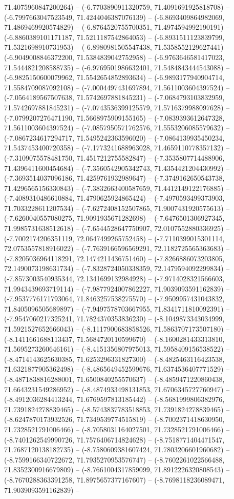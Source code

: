 71.4075960847200264) -- (-6.7703890911320759, 71.4091691925818708) -- (-6.7997663047523549, 71.4244046387076139) -- (-6.8693409864982069, 71.4869469920574829) -- (-6.8764520755700351, 71.4974594992190191) -- (-6.8860389101171187, 71.5211187542864053) -- (-6.8931511123839799, 71.5321698910731953) -- (-6.8980981505547438, 71.5358552129627441) -- (-6.9049008846372200, 71.5384839042752958) -- (-6.9763646581417023, 71.5444821208588735) -- (-6.9769501986632401, 71.5484843444543088) -- (-6.9825150600079962, 71.5542654852893634) -- (-6.9893177940904714, 71.5584709087092108) -- (-7.0004497431697894, 71.5611003604397524) -- (-7.0564189567507638, 71.5742697881845231) -- (-7.0684793103832959, 71.5742697881845231) -- (-7.0743536399125579, 71.5716379988097628) -- (-7.0799207276471190, 71.5668975909155165) -- (-7.0839393612647328, 71.5611003604397524) -- (-7.0857950571762576, 71.5553206085579632) -- (-7.0867234617294717, 71.5495242363596020) -- (-7.0864139935450234, 71.5437453400720358) -- (-7.1773241688963028, 71.4659110778357132) -- (-7.3109075578481750, 71.4517212755582847) -- (-7.3535807714488906, 71.4396411600454684) -- (-7.3560542905342743, 71.4354421204430992) -- (-7.3693514037096186, 71.4259761932989647) -- (-7.3749162650543738, 71.4296565156330843) -- (-7.3832663400587659, 71.4412149122176885) -- (-7.4089310486610884, 71.4790625924865424) -- (-7.4970593499373903, 71.7033228611207534) -- (-7.6272408152507865, 71.9007431920575613) -- (-7.6260040557080275, 71.9091935671282698) -- (-7.6476501306927345, 71.9985731638512618) -- (-7.6544528647750907, 72.0107552880336925) -- (-7.7002174206351119, 72.0647499265752458) -- (-7.7110399015301114, 72.0753557818916022) -- (-7.7639166596569291, 72.1182725565363683) -- (-7.8205036964118291, 72.1474211436751460) -- (-7.8266886073203805, 72.1490073198631734) -- (-7.8328724050338359, 72.1479594092299834) -- (-7.8573003540935344, 72.1341699132984928) -- (-7.9714028321566603, 71.9943439693719114) -- (-7.9877924007862227, 71.9039093591162839) -- (-7.9537776171793064, 71.8463257538275570) -- (-7.9509957431043832, 71.8405096505689897) -- (-7.9497578703667955, 71.8341711810092391) -- (-7.9547060217325241, 71.7824370353836230) -- (-8.1049873343034999, 71.5921527652666043) -- (-8.1117900683858526, 71.5863707173507180) -- (-8.1411661688113437, 71.5684720110599670) -- (-8.1600281433313810, 71.5695273260646161) -- (-8.4151356807975013, 71.5958409156538522) -- (-8.4714143625630385, 71.6253296331827300) -- (-8.4825463116423538, 71.6321877905362498) -- (-8.4865649452599676, 71.6374536407771529) -- (-8.4871838816288001, 71.6500840255570637) -- (-8.4859471220860438, 71.6643231549286952) -- (-8.4874933498131853, 71.6706345727760947) -- (-8.4912036284413244, 71.6769597813185442) -- (-8.5681999806382976, 71.7391824278839465) -- (-8.5743837783518853, 71.7391824278839465) -- (-8.6247870173932526, 71.7349539774515819) -- (-8.7002371418630950, 71.7328521791006466) -- (-8.7058031164027501, 71.7328521791006466) -- (-8.7401262549990726, 71.7576406714824628) -- (-8.7518771404471547, 71.7687120138182735) -- (-8.7580609381607424, 71.7803206601960682) -- (-8.7599166340722672, 71.7935270953576747) -- (-8.7602261022566488, 71.8352300916679809) -- (-8.7661004317859099, 71.8912226320808543) -- (-8.7670288363391258, 71.8975657377167607) -- (-8.7698118236089471, 71.9039093591162839) -- 